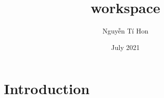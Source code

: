 \documentclass{article}
\title{workspace}
\author{Nguyễn Tí Hon}
\date{July 2021}
\begin{document}
\maketitle

\section{Introduction}
\end{document}
